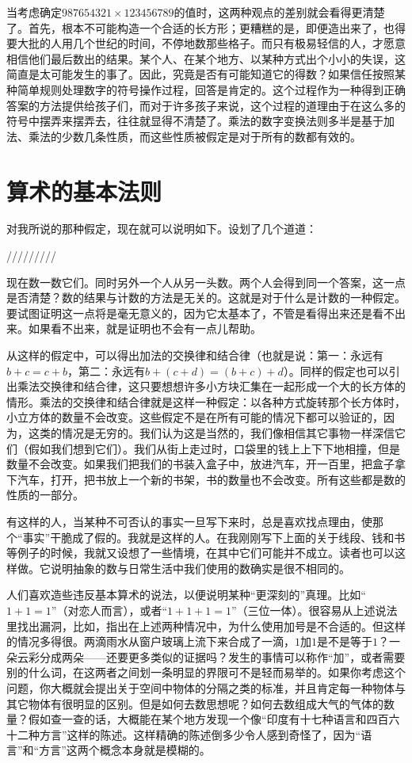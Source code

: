当考虑确定$987654321\times 123456789$的值时，这两种观点的差别就会看得更清楚了。首先，根本不可能构造一个合适的长方形；更糟糕的是，即便造出来了，也得要大批的人用几个世纪的时间，不停地数那些格子。而只有极易轻信的人，才愿意相信他们最后数出的结果。某个人、在某个地方、以某种方式出个小小的失误，这简直是太可能发生的事了。因此，究竟是否有可能知道它的得数？如果信任按照某种简单规则处理数字的符号操作过程，回答是肯定的。这个过程作为一种得到正确答案的方法提供给孩子们，而对于许多孩子来说，这个过程的道理由于在这么多的符号中摆弄来摆弄去，往往就显得不清楚了。乘法的数字变换法则多半是基于加法、乘法的少数几条性质，而这些性质被假定是对于所有的数都有效的。

\section{算术的基本法则}

对我所说的那种假定，现在就可以说明如下。设划了几个道道：
\begin{center}
/\quad //\quad //\quad //\quad /\quad /
\end{center}
现在数一数它们。同时另外一个人从另一头数。两个人会得到同一个答案，这一点是否清楚？数的结果与计数的方法是无关的。这就是对于什么是计数的一种假定。要试图证明这一点将是毫无意义的，因为它太基本了，不管是看得出来还是看不出来。如果看不出来，就是证明也不会有一点儿帮助。

从这样的假定中，可以得出加法的交换律和结合律（也就是说：第一：永远有$b+c=c+b$，第二：永远有$b+(c+d)=(b+c)+d$）。同样的假定也可以引出乘法交换律和结合律，这只要想想许多小方块汇集在一起形成一个大的长方体的情形。乘法的交换律和结合律就是这样一种假定：以各种方式旋转那个长方体时，小立方体的数量不会改变。这些假定不是在所有可能的情况下都可以验证的，因为，这类的情况是无穷的。我们认为这是当然的，我们像相信其它事物一样深信它们（假如我们想到它们）。我们从街上走过时，口袋里的钱上上下下地相撞，但是数量不会改变。如果我们把我们的书装入盒子中，放进汽车，开一百里，把盒子拿下汽车，打开，把书放上一个新的书架，书的数量也不会改变。所有这些都是数的性质的一部分。

有这样的人，当某种不可否认的事实一旦写下来时，总是喜欢找点理由，使那个“事实”干脆成了假的。我就是这样的人。在我刚刚写下上面的关于线段、钱和书等例子的时候，我就又设想了一些情境，在其中它们可能并不成立。读者也可以这样做。它说明抽象的数与日常生活中我们使用的数确实是很不相同的。

人们喜欢造些违反基本算术的说法，以便说明某种“更深刻的”真理。比如“$1+1=1$”（对恋人而言），或者“$1+1+1=1$”（三位一体）。很容易从上述说法里找出漏洞，比如，指出在上述两种情况中，为什么使用加号是不合适的。但这样的情况多得很。两滴雨水从窗户玻璃上流下来合成了一滴，$1$加$1$是不是等于$1$？一朵云彩分成两朵——还要更多类似的证据吗？发生的事情可以称作“加”，或者需要别的什么词，在这两者之间划一条明显的界限可不是轻而易举的。如果你考虑这个问题，你大概就会提出关于空间中物体的分隔之类的标准，并且肯定每一种物体与其它物体有很明显的区别。但是如何去数思想呢？如何去数组成大气的气体的数量？假如查一查的话，大概能在某个地方发现一个像“印度有十七种语言和四百六十二种方言”这样的陈述。这样精确的陈述倒多少令人感到奇怪了，因为“语言”和“方言”这两个概念本身就是模糊的。

